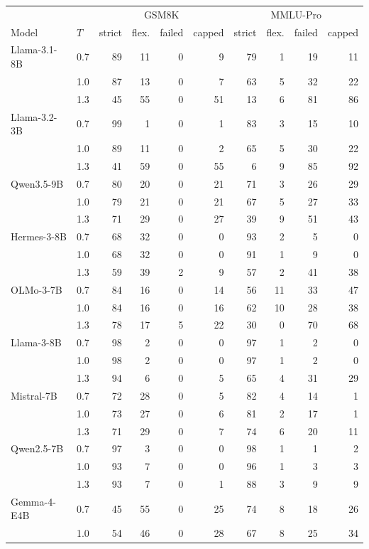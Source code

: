 \begin{tabular}{llrrrrrrrr}
\toprule
 & & \multicolumn{4}{c}{GSM8K} & \multicolumn{4}{c}{MMLU-Pro} \\
Model & $T$ & strict & flex. & failed & capped & strict & flex. & failed & capped \\
\midrule
Llama-3.1-8B & 0.7 & 89 & 11 & 0 & 9 & 79 & 1 & 19 & 11 \\
 & 1.0 & 87 & 13 & 0 & 7 & 63 & 5 & 32 & 22 \\
 & 1.3 & 45 & 55 & 0 & 51 & 13 & 6 & 81 & 86 \\
Llama-3.2-3B & 0.7 & 99 & 1 & 0 & 1 & 83 & 3 & 15 & 10 \\
 & 1.0 & 89 & 11 & 0 & 2 & 65 & 5 & 30 & 22 \\
 & 1.3 & 41 & 59 & 0 & 55 & 6 & 9 & 85 & 92 \\
Qwen3.5-9B & 0.7 & 80 & 20 & 0 & 21 & 71 & 3 & 26 & 29 \\
 & 1.0 & 79 & 21 & 0 & 21 & 67 & 5 & 27 & 33 \\
 & 1.3 & 71 & 29 & 0 & 27 & 39 & 9 & 51 & 43 \\
Hermes-3-8B & 0.7 & 68 & 32 & 0 & 0 & 93 & 2 & 5 & 0 \\
 & 1.0 & 68 & 32 & 0 & 0 & 91 & 1 & 9 & 0 \\
 & 1.3 & 59 & 39 & 2 & 9 & 57 & 2 & 41 & 38 \\
OLMo-3-7B & 0.7 & 84 & 16 & 0 & 14 & 56 & 11 & 33 & 47 \\
 & 1.0 & 84 & 16 & 0 & 16 & 62 & 10 & 28 & 38 \\
 & 1.3 & 78 & 17 & 5 & 22 & 30 & 0 & 70 & 68 \\
Llama-3-8B & 0.7 & 98 & 2 & 0 & 0 & 97 & 1 & 2 & 0 \\
 & 1.0 & 98 & 2 & 0 & 0 & 97 & 1 & 2 & 0 \\
 & 1.3 & 94 & 6 & 0 & 5 & 65 & 4 & 31 & 29 \\
Mistral-7B & 0.7 & 72 & 28 & 0 & 5 & 82 & 4 & 14 & 1 \\
 & 1.0 & 73 & 27 & 0 & 6 & 81 & 2 & 17 & 1 \\
 & 1.3 & 71 & 29 & 0 & 7 & 74 & 6 & 20 & 11 \\
Qwen2.5-7B & 0.7 & 97 & 3 & 0 & 0 & 98 & 1 & 1 & 2 \\
 & 1.0 & 93 & 7 & 0 & 0 & 96 & 1 & 3 & 3 \\
 & 1.3 & 93 & 7 & 0 & 1 & 88 & 3 & 9 & 9 \\
Gemma-4-E4B & 0.7 & 45 & 55 & 0 & 25 & 74 & 8 & 18 & 26 \\
 & 1.0 & 54 & 46 & 0 & 28 & 67 & 8 & 25 & 34 \\

\end{tabular}
